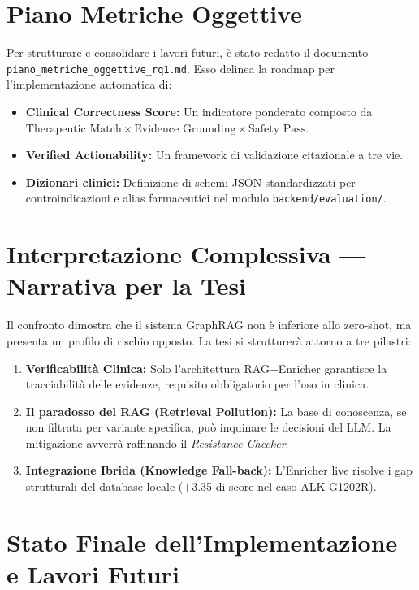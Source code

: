 \documentclass[12pt, a4paper]{article}
\begin{document}
\section{Piano Metriche Oggettive}
Per strutturare e consolidare i lavori futuri, è stato redatto il documento \texttt{piano\_metriche\_oggettive\_rq1.md}. Esso delinea la roadmap per l'implementazione automatica di:
\begin{itemize}[leftmargin=1.6em, itemsep=2pt]
  \item \textbf{Clinical Correctness Score:} Un indicatore ponderato composto da $\text{Therapeutic Match} \times \text{Evidence Grounding} \times \text{Safety Pass}$.
  \item \textbf{Verified Actionability:} Un framework di validazione citazionale a tre vie.
  \item \textbf{Dizionari clinici:} Definizione di schemi JSON standardizzati per controindicazioni e alias farmaceutici nel modulo \texttt{backend/evaluation/}.
\end{itemize}

\section{Interpretazione Complessiva --- Narrativa per la Tesi}
Il confronto dimostra che il sistema GraphRAG non è inferiore allo zero-shot, ma presenta un profilo di rischio opposto. La tesi si strutturerà attorno a tre pilastri:
\begin{enumerate}[leftmargin=1.6em, itemsep=4pt]
  \item \textbf{Verificabilità Clinica:} Solo l'architettura RAG+Enricher garantisce la tracciabilità delle evidenze, requisito obbligatorio per l'uso in clinica.
  \item \textbf{Il paradosso del RAG (Retrieval Pollution):} La base di conoscenza, se non filtrata per variante specifica, può inquinare le decisioni del LLM. La mitigazione avverrà raffinando il \textit{Resistance Checker}.
  \item \textbf{Integrazione Ibrida (Knowledge Fall-back):} L'Enricher live risolve i gap strutturali del database locale (+3.35 di score nel caso ALK G1202R).
\end{enumerate}

\section{Stato Finale dell'Implementazione e Lavori Futuri}
\end{document}
